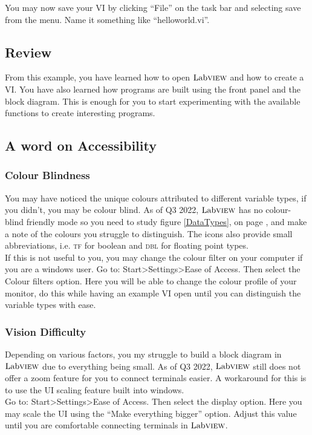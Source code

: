 	You may now save your VI by clicking ``File'' on the task bar and selecting save from the menu. Name it something like ``helloworld.vi''.
	
	\subsection{Review}
	From this example, you have learned how to open $\text{Lab}\textsc{view}$ and how to create a VI. You have also learned how programs are built using the front panel and the block diagram. This is enough for you to start experimenting with the available functions to create interesting programs.
	
	\subsection{A word on Accessibility}
	\subsubsection{Colour Blindness}
	You may have noticed the unique colours attributed to different variable types, if you didn't, you may be colour blind. As of Q3 2022, $\text{Lab}\textsc{view}$ has no colour-blind friendly mode so you need to study figure \ref{DataTypes}, on page \pageref{DataTypes}, and make a note of the colours you struggle to distinguish. The icons also provide small abbreviations, i.e.  \textsc{tf} for boolean and \textsc{dbl} for floating point types.\\
	
	If this is not useful to you, you may change the colour filter on your computer if you are a windows user. Go to: Start\textgreater Settings\textgreater Ease of Access. Then select the Colour filters option. Here you will be able to change the colour profile of your monitor, do this while having an example VI open until you can distinguish the variable types with ease.
	\subsubsection{Vision Difficulty}
	Depending on various factors, you my struggle to build a block diagram in $\text{Lab}\textsc{view}$ due to everything being small. As of Q3 2022, $\text{Lab}\textsc{view}$ still does not offer a zoom feature for you to connect terminals easier. A workaround for this is to use the UI scaling feature built into windows.\\
	Go to: Start\textgreater Settings\textgreater Ease of Access. Then select the display option. Here you may scale the UI using the ``Make everything bigger'' option. Adjust this value until you are comfortable connecting terminals in $\text{Lab}\textsc{view}$.
	
